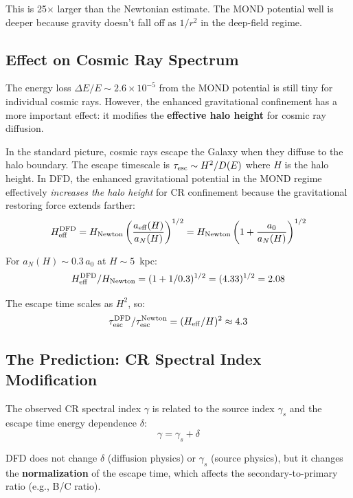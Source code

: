 \documentclass[11pt]{article}
\begin{document}
This is 25$\times$ larger than the Newtonian estimate. The MOND potential
well is deeper because gravity doesn't fall off as $1/r^2$ in the deep-field
regime.

\subsection{Effect on Cosmic Ray Spectrum}

The energy loss $\Delta E/E \sim 2.6 \times 10^{-5}$ from the MOND potential
is still tiny for individual cosmic rays. However, the enhanced gravitational
confinement has a more important effect: it modifies the \textbf{effective
halo height} for cosmic ray diffusion.

In the standard picture, cosmic rays escape the Galaxy when they diffuse
to the halo boundary. The escape timescale is $\tau_{\rm esc} \sim H^2/D(E)$
where $H$ is the halo height. In DFD, the enhanced gravitational potential
in the MOND regime effectively \emph{increases the halo height} for CR
confinement because the gravitational restoring force extends farther:
\begin{equation}
H_{\rm eff}^{\rm DFD} = H_{\rm Newton}\left(\frac{a_{\rm eff}(H)}{a_N(H)}\right)^{1/2}
= H_{\rm Newton}\left(1 + \frac{a_0}{a_N(H)}\right)^{1/2}
\end{equation}

For $a_N(H) \sim 0.3\,a_0$ at $H \sim 5$~kpc:
\begin{equation}
H_{\rm eff}^{\rm DFD}/H_{\rm Newton} = (1 + 1/0.3)^{1/2} = (4.33)^{1/2} = 2.08
\end{equation}

The escape time scales as $H^2$, so:
\begin{equation}
\tau_{\rm esc}^{\rm DFD}/\tau_{\rm esc}^{\rm Newton} = (H_{\rm eff}/H)^2 \approx 4.3
\end{equation}

\subsection{The Prediction: CR Spectral Index Modification}

The observed CR spectral index $\gamma$ is related to the source index
$\gamma_s$ and the escape time energy dependence $\delta$:
\begin{equation}
\gamma = \gamma_s + \delta
\end{equation}

DFD does not change $\delta$ (diffusion physics) or $\gamma_s$ (source
physics), but it changes the \textbf{normalization} of the escape time,
which affects the secondary-to-primary ratio (e.g., B/C ratio).
\end{document}
